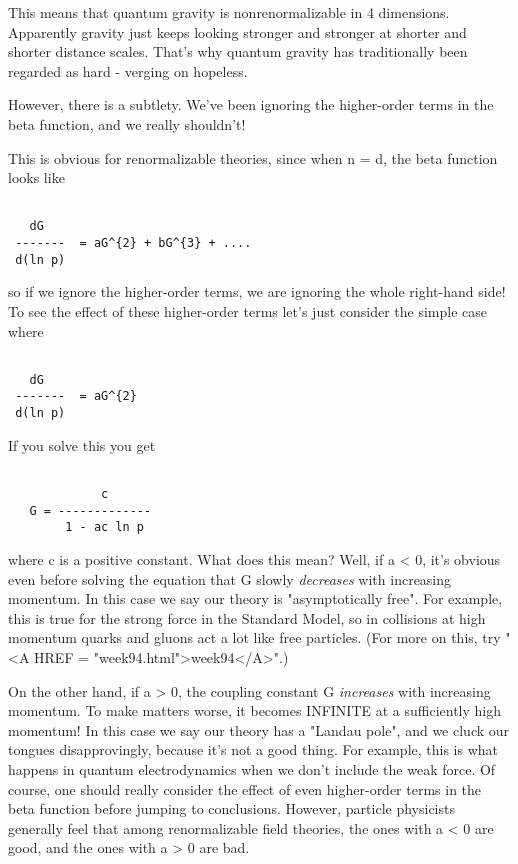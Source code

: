 This means that quantum gravity is nonrenormalizable in 4 dimensions.
Apparently gravity just keeps looking stronger and stronger at 
shorter and shorter distance scales.  That's why quantum gravity has 
traditionally been regarded as hard - verging on hopeless.  

However, there is a subtlety.  We've been ignoring the higher-order
terms in the beta function, and we really shouldn't!

This is obvious for renormalizable theories, since when n = d, the 
beta function looks like


\begin{verbatim}

   dG 
 -------  = aG^{2} + bG^{3} + ....
 d(ln p)
\end{verbatim}
    
so if we ignore the higher-order terms, we are ignoring the whole 
right-hand side!  To see the effect of these higher-order terms let's 
just consider the simple case where


\begin{verbatim}

   dG 
 -------  = aG^{2}
 d(ln p)
\end{verbatim}
    
If you solve this you get


\begin{verbatim}

             c 
   G = -------------
        1 - ac ln p 
\end{verbatim}
    
where c is a positive constant.   What does this mean?  Well, if a < 0, 
it's obvious even before solving the equation that G slowly \emph{decreases} 
with increasing momentum.  In this case we say our theory is 
"asymptotically free".   For example, this is true for the strong 
force in the Standard Model, so in collisions at high momentum quarks 
and gluons act a lot like free particles.  (For more on this, try "<A HREF = "week94.html">week94</A>".)

On the other hand, if a > 0, the coupling constant G
\emph{increases} with increasing momentum.  To make matters worse, it
becomes INFINITE at a sufficiently high momentum!  In this case we say
our theory has a "Landau pole", and we cluck our tongues
disapprovingly, because it's not a good thing.  For example, this is
what happens in quantum electrodynamics when we don't include the weak
force.  Of course, one should really consider the effect of even
higher-order terms in the beta function before jumping to conclusions.
However, particle physicists generally feel that among renormalizable
field theories, the ones with a < 0 are good, and the ones with a
> 0 are bad.


